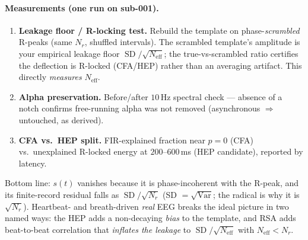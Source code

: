 \documentclass[11pt]{article}
\newcommand{\Var}{\operatorname{Var}}
\newcommand{\SD}{\operatorname{SD}}
\begin{document}
\paragraph{Measurements (one run on sub-001).}
\begin{enumerate}[leftmargin=1.4em,itemsep=2pt]
\item \textbf{Leakage floor / R-locking test.} Rebuild the template on phase-\emph{scrambled}
R-peaks (same $N_r$, shuffled intervals). The scrambled template's amplitude is your empirical
leakage floor $\SD/\sqrt{N_{\mathrm{eff}}}$; the true-vs-scrambled ratio certifies the deflection
is R-locked (CFA/HEP) rather than an averaging artifact. This directly \emph{measures}
$N_{\mathrm{eff}}$.
\item \textbf{Alpha preservation.} Before/after $10$\,Hz spectral check --- absence of a notch
confirms free-running alpha was not removed (asynchronous $\Rightarrow$ untouched, as derived).
\item \textbf{CFA vs.\ HEP split.} FIR-explained fraction near $p=0$ (CFA) vs.\ unexplained
R-locked energy at $200$--$600$\,ms (HEP candidate), reported by latency.
\end{enumerate}

\noindent
Bottom line: $s(t)$ vanishes because it is phase-incoherent with the R-peak, and its finite-record
residual falls as $\SD/\sqrt{N_r}$ (SD $=\sqrt{\Var}$; the radical is why it is $\sqrt{N_r}$).
Heartbeat- and breath-driven \emph{real} EEG breaks the ideal picture in two named ways: the HEP
adds a non-decaying \emph{bias} to the template, and RSA adds beat-to-beat correlation that
\emph{inflates the leakage} to $\SD/\sqrt{N_{\mathrm{eff}}}$ with $N_{\mathrm{eff}}<N_r$.
\end{document}
